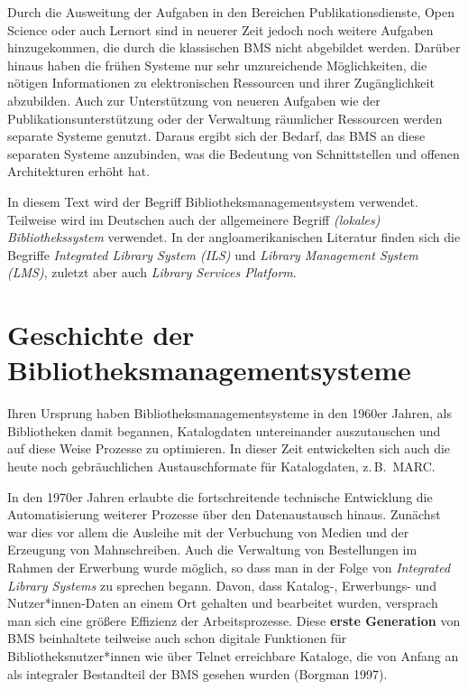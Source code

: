 \documentclass[
  11pt,
  letterpaper,
  DIV=11,
  twoside]{scrreprt}
\begin{document}
Durch die Ausweitung der Aufgaben in den Bereichen Publikationsdienste,
Open Science oder auch Lernort sind in neuerer Zeit jedoch noch weitere
Aufgaben hinzugekommen, die durch die klassischen BMS nicht abgebildet
werden. Darüber hinaus haben die frühen Systeme nur sehr unzureichende
Möglichkeiten, die nötigen Informationen zu elektronischen Ressourcen
und ihrer Zugänglichkeit abzubilden. Auch zur Unterstützung von neueren
Aufgaben wie der Publikationsunterstützung oder der Verwaltung
räumlicher Ressourcen werden separate Systeme genutzt. Daraus ergibt
sich der Bedarf, das BMS an diese separaten Systeme anzubinden, was die
Bedeutung von Schnittstellen und offenen Architekturen erhöht hat.

In diesem Text wird der Begriff Bibliotheksmanagementsystem verwendet.
Teilweise wird im Deutschen auch der allgemeinere Begriff
\emph{(lokales) Bibliothekssystem} verwendet. In der angloamerikanischen
Literatur finden sich die Begriffe \emph{Integrated Library System
(ILS)} und \emph{Library Management System (LMS)}, zuletzt aber auch
\emph{Library Services Platform}.

\section{Geschichte der
Bibliotheksmanagementsysteme}\label{geschichte-der-bibliotheksmanagementsysteme}

Ihren Ursprung haben Bibliotheksmanagementsysteme in den 1960er Jahren,
als Bibliotheken damit begannen, Katalogdaten untereinander
auszutauschen und auf diese Weise Prozesse zu optimieren. In dieser Zeit
entwickelten sich auch die heute noch gebräuchlichen Austauschformate
für Katalogdaten, z.\,B.~{MARC}.

In den 1970er Jahren erlaubte die fortschreitende technische Entwicklung
die Automatisierung weiterer Prozesse über den Datenaustausch hinaus.
Zunächst war dies vor allem die Ausleihe mit der Verbuchung von Medien
und der Erzeugung von Mahnschreiben. Auch die Verwaltung von
Bestellungen im Rahmen der Erwerbung wurde möglich, so dass man in der
Folge von \emph{Integrated Library Systems} zu sprechen begann. Davon,
dass Katalog-, Erwerbungs- und Nutzer*innen-Daten an einem Ort gehalten
und bearbeitet wurden, versprach man sich eine größere Effizienz der
Arbeitsprozesse. Diese \textbf{erste Generation} von BMS beinhaltete
teilweise auch schon digitale Funktionen für Bibliotheksnutzer*innen wie
über Telnet erreichbare Kataloge, die von Anfang an als integraler
Bestandteil der BMS gesehen wurden (Borgman 1997).
\end{document}
